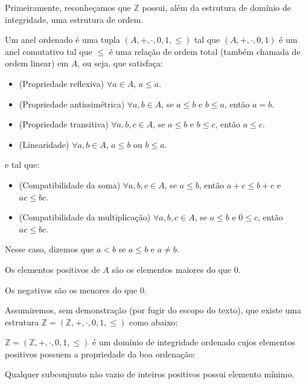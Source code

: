 Primeiramente, reconheçamos que $\mathbb Z$ possui, além da estrutura de domínio de integridade, uma estrutura de ordem.

\begin{definition}
    Um anel ordenado é uma tupla $(A, +, \cdot, 0, 1, \leq)$ tal que $(A, +, \cdot, 0, 1)$ é um anel comutativo tal que $\leq$ é uma relação de ordem total (também chamada de ordem linear) em $A$, ou seja, que satisfaça:

    \begin{itemize}
        \item (Propriedade reflexiva) $\forall a \in A$, $a \leq a$.
        \item (Propriedade antissimétrica) $\forall a, b \in A$, se $a \leq b$ e $b \leq a$, então $a=b$.
        \item (Propriedade transitiva) $\forall a, b, c \in A$, se $a \leq b$ e $b \leq c$, então $a \leq c$.
        \item (Linearidade) $\forall a, b \in A$, $a \leq b$ ou $b \leq a$.
    \end{itemize}

    e tal que:

    \begin{itemize}
        \item (Compatibilidade da soma) $\forall a, b, c \in A$, se $a \leq b$, então $a+c \leq b+c$ e $ac \leq bc$.
        \item (Compatibilidade da multiplicação) $\forall a, b, c \in A$, se $a \leq b$ e $0 \leq c$, então $ac \leq bc$.
    \end{itemize}

    Nesse caso, dizemos que $a<b$ se $a\leq b$ e $a\neq b$.
    
    Os elementos positivos de $A$ são os elementos maiores do que $0$.
    
    Os negativos são os menores do que $0$.
\end{definition}

Assumiremos, sem demonstração (por fugir do escopo do texto), que existe uma estrutura $\mathbb Z=(\mathbb Z,+,\cdot,0,1, \leq)$ como abaixo:

\begin{definition}
$\mathbb Z=(\mathbb Z,+,\cdot,0,1, \leq)$ é um domínio de integridade ordenado cujos elementos positivos possuem a propriedade da boa ordenação:

Qualquer subconjunto não vazio de inteiros positivos possui elemento mínimo.
\end{definition}


